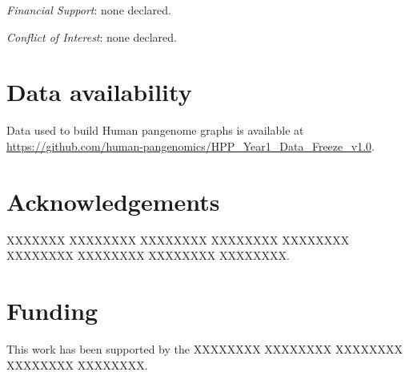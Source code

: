 \documentclass{bioinfo}
\begin{document}

%
%

    \vspace*{+12pt}
    \textit{Financial Support}: none declared.

    \textit{Conflict of Interest}: none declared.
    \vspace*{+12pt}

    \section*{Data availability}

    Data used to build Human pangenome graphs is available at \href{https://github.com/human-pangenomics/HPP_Year1_Data_Freeze_v1.0}{https://github.com/human-pangenomics/HPP\_Year1\_Data\_Freeze\_v1.0}.

    \section*{Acknowledgements}
    XXXXXXX XXXXXXXX XXXXXXXX XXXXXXXX XXXXXXXX XXXXXXXX XXXXXXXX XXXXXXXX XXXXXXXX.


    \section*{Funding}
    This work has been supported by the XXXXXXXX XXXXXXXX XXXXXXXX XXXXXXXX XXXXXXXX.


%
%
%
%
%
%
%
%
%
\end{document}
